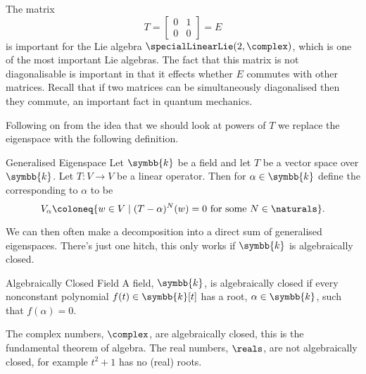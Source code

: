 \documentclass[fleqn]{NotesClass}
\renewcommand{\field}{\symbb{k}}
\begin{document}
    \begin{remark}{}{}
        The matrix
        \begin{equation}
            T = 
            \begin{bmatrix}
                0 & 1\\
                0 & 0
            \end{bmatrix}
            = E
        \end{equation}
        is important for the Lie algebra \(\specialLinearLie(2, \complex)\), which is one of the most important Lie algebras.
        The fact that this matrix is not diagonalisable is important in that it effects whether \(E\) commutes with other matrices.
        Recall that if two matrices can be simultaneously diagonalised then they commute, an important fact in quantum mechanics.
    \end{remark}
    
    Following on from the idea that we should look at powers of \(T\) we replace the eigenspace with the following definition.
    
    \begin{dfn}{Generalised Eigenspace}{}
        Let \(\field\) be a field and let \(T\) be a vector space over \(\field\).
        Let \(T \colon V \to V\) be a linear operator.
        Then for \(\alpha \in \field\) define the  corresponding to \(\alpha\) to be
        \begin{equation}
            V_\alpha \coloneq \{w \in V \mid (T - \alpha)^N(w) = 0 \text{ for some } N \in \naturals\}.
        \end{equation}
    \end{dfn}
    
    We can then often make a decomposition into a direct sum of generalised eigenspaces.
    There's just one hitch, this only works if \(\field\) is algebraically closed.
    
    \begin{dfn}{Algebraically Closed Field}{}
        A field, \(\field\), is algebraically closed if every nonconstant polynomial \(f(t) \in \field[t]\) has a root, \(\alpha \in \field\), such that \(f(\alpha) = 0\).
    \end{dfn}
    
    The complex numbers, \(\complex\), are algebraically closed, this is the fundamental theorem of algebra.
    The real numbers, \(\reals\), are not algebraically closed, for example \(t^2 + 1\) has no (real) roots.
    
\end{document}
